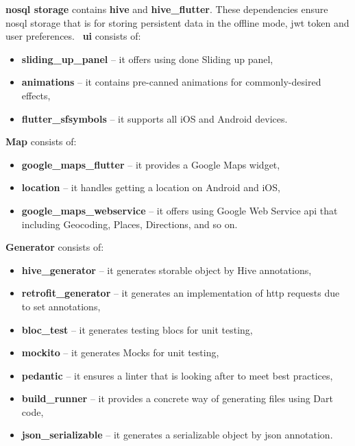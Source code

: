 \textbf{\acrshort{nosql} storage} contains \textbf{hive} and \textbf{hive\_flutter}.
These dependencies ensure \acrshort{nosql} storage that is for storing persistent data in the offline mode, \acrshort{jwt} token and user preferences.~\cite{jwtToken}
\newline
\newline
\textbf{\acrshort{ui}} consists of:
\begin{itemize}
    \item \textbf{sliding\_up\_panel} -- it offers using done Sliding up panel,
    \item \textbf{animations} -- it contains pre-canned animations for commonly-desired effects,
    \item \textbf{flutter\_sfsymbols} -- it supports all iOS and Android devices.
\end{itemize}
\textbf{Map} consists of:
\begin{itemize}
    \item \textbf{google\_maps\_flutter} -- it provides a Google Maps widget,
    \item \textbf{location} -- it handles getting a location on Android and iOS,
    \item \textbf{google\_maps\_webservice} -- it offers using Google Web Service \acrshort{api} that including Geocoding, Places, Directions, and so on.
\end{itemize}
\textbf{Generator} consists of:
\begin{itemize}
    \item \textbf{hive\_generator} -- it generates storable object by Hive annotations,
    \item \textbf{retrofit\_generator} -- it generates an implementation of \acrshort{http} requests due to set annotations,
    \item \textbf{bloc\_test} -- it generates testing blocs for unit testing,
    \item \textbf{mockito} -- it generates Mocks for unit testing,
    \item \textbf{pedantic} -- it ensures a linter that is looking after to meet best practices,
    \item \textbf{build\_runner} -- it provides a concrete way of generating files using Dart code,
    \item \textbf{json\_serializable} -- it generates a serializable object by \acrshort{json} annotation.
\end{itemize}
